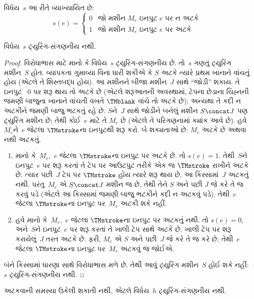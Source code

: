 \begin{defn} વિધેય~$s$ આ રીતે વ્યાખ્યાયિત છે:
\[
s(e) =
\begin{cases}
  \text{0} & \text{જો મશીન~$M_e$ ઇનપુટ $e$ પર ન અટકે} \\
  \text{1} & \text{જો મશીન~$M_e$ ઇનપુટ $e$ પર અટકે}
\end{cases}
\]
\end{defn}

\begin{lem}
વિધેય~$s$ ટ્યુરિંગ-સંગણનીય નથી.
\end{lem}

\begin{proof}
વિરોધાભાસ માટે માનો કે વિધેય~$s$ ટ્યુરિંગ-સંગણનીય
છે. તો~$s$ ગણતું ટ્યુરિંગ મશીન~$S$ હોત. વ્યાપકતા
ગુમાવ્યા વિના ધારી શકીએ કે $S$ અટકે ત્યારે પ્રથમ
ખાનાને વાંચતું હોય (એટલે તે શિસ્તબદ્ધ હોય). આ
મશીનને બીજા મશીન~$J$ સાથે ``જોડી'' શકાય. તે ઇનપુટ
~$0$ પર શરૂ થાય તો અટકે છે (એટલે શરૂઆતની અવસ્થામાં,
ટેપના છેડાના ચિહ્નની જમણી બાજુના ખાનાને વાંચતી વખતે
$\TMblank$ વાંચે તો અટકે છે); અન્યથા તે કદી ન અટકીને
જમણી બાજુ ભટકતું રહે છે. $S$ને~$J$ સાથે જોડીને
બનેલું મશીન $S \concat J$ પણ ટ્યુરિંગ મશીન છે;
તેથી કોઈ~$e$ માટે તે $M_e$ છે (એટલે તે પરિગણનામાં
ક્યાંક આવે છે). હવે~$M_e$ને~$e$ જેટલા $\TMstroke$ના
ઇનપુટથી શરૂ કરો. બે શક્યતાઓ છે: $M_e$ અટકે છે
અથવા નથી અટકતું.
\begin{enumerate}
\item માનો કે~$M_e$,~$e$ જેટલા $\TMstroke$ના ઇનપુટ
  પર અટકે છે. તો $s(e) = 1$. તેથી~$S$ને ઇનપુટ~$e$
  પર શરૂ કરતાં તે ટેપ પર આઉટપુટ તરીકે એક જ
  $\TMstroke$ રાખીને અટકે છે. ત્યાર પછી~$J$ ટેપ પર
  $\TMstroke$ હોય ત્યારે શરૂ થાય છે. આ કિસ્સામાં~$J$
  અટકતું નથી. પરંતુ~$M_e$ એ $S \concat J$ મશીન જ
  છે, તેથી તેને $S$ અને પછી $J$ જે કરે તે જ કરવું
  પડે (એટલે આ કિસ્સામાં જમણી બાજુ ભટકીને કદી ન
  અટકવું પડે). તેથી~$e$ જેટલા $\TMstroke$ના ઇનપુટ
  પર~$M_e$ અટકી શકે નહીં.

\item હવે માનો કે~$M_e$,~$e$ જેટલા $\TMstroke$ના
  ઇનપુટ પર અટકતું નથી. તો $s(e) = 0$, અને~$S$ને
  ઇનપુટ~$e$ પર શરૂ કરતાં તે ખાલી ટેપ સાથે અટકે છે.
  ખાલી ટેપ પર શરૂ કરાયેલું~$J$ તરત અટકે છે. ફરી,
  $M_e$ એ $S$ અને પછી~$J$ જે કરે તે જ કરે છે;
  તેથી~$e$ જેટલા $\TMstroke$ના ઇનપુટ પર~$M_e$
  અટકવું જ જોઈએ.
\end{enumerate}
બંને કિસ્સામાં ધારણા સાથે વિરોધાભાસ મળે છે. તેથી
આવું ટ્યુરિંગ મશીન~$S$ હોઈ શકે નહીં: $s$ ટ્યુરિંગ-સંગણનીય
નથી.
\end{proof}

\begin{thm}
 અટકવાની સમસ્યા ઉકેલી
શકાતી નથી, એટલે વિધેય~$h$ ટ્યુરિંગ-સંગણનીય નથી.
\end{thm}

